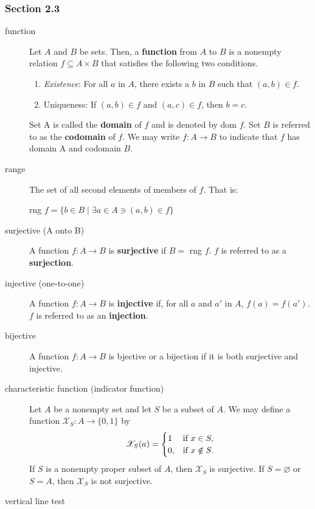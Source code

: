 \documentclass[12pt]{article}
\newcommand\sube{\subseteq}
\newcommand\pr{\ensuremath{'}}
\newcommand\indX{\mathscr{X}}
\newcommand\nil{\varnothing}
\begin{document}
\subsubsection{Section 2.3}
\label{sec:org1272093}
\begin{description}
\item[{function}] Let \(A\) and \(B\) be sets. Then, a \textbf{function} from \(A\) to \(B\) is a
nonempty relation \(f\sube{}A\times{}B\) that satisfies the following two
conditions.
\begin{enumerate}
\item \emph{Existence}: For all \(a\) in \(A\), there exists a \(b\) in \(B\) such that
\((a,b)\in{}f\).
\item Uniqueness: If \((a,b)\in{}f\) and \((a,c)\in{}f\), then \(b=c\).
\end{enumerate}
Set A is called the \textbf{domain} of \(f\) and is denoted by dom \(f\). Set \(B\) is
            referred to as the \textbf{codomain} of \(f\). We may write
            \(f:A\longrightarrow{}B\) to indicate that \(f\) has domain A and
            codomain \(B\).
\item[{range}] The set of all second elements of members of \(f\). That is:
\begin{center}
rng \(f = \{b\in{}B\mid{}\exists{}a\in{}A\ni(a,b)\in{}f\}\)
\end{center}
\item[{surjective (A onto B)}] A function \(f:A\longrightarrow{}B\) is \textbf{surjective} if
\(B=\) rng \(f\). \(f\) is referred to as a \textbf{surjection}.
\item[{injective (one-to-one)}] A function \(f:A\longrightarrow{}B\) is \textbf{injective} if,
for all \(a\) and \(a\pr\) in \(A\), \(f(a)=f(a\pr)\). \(f\) is referred to as an
\textbf{injection}.
\item[{bijective}] A function \(f:A\longrightarrow{}B\) is bjective or a bijection if
it is both surjective and injective.
\item[{characteristic function (indicator function)}] Let \(A\) be a nonempty set and
let \(S\) be a subset of \(A\). We may define a function
\(\indX_S:A\longrightarrow{}\{0,1\}\) by
\[\indX_S(a)= 
  \begin{cases} 
    1 & $if $x\in{}S,  \\
    0, & $if $x\notin{}S.
  \end{cases} \]
If \(S\) is a nonempty proper subset of \(A\), then \(\indX_S\) is surjective. If
   \(S=\nil\) or \(S=A\), then \(\indX_S\) is not surjective.
\item[{vertical line test}] 


\end{description}
\end{document}
